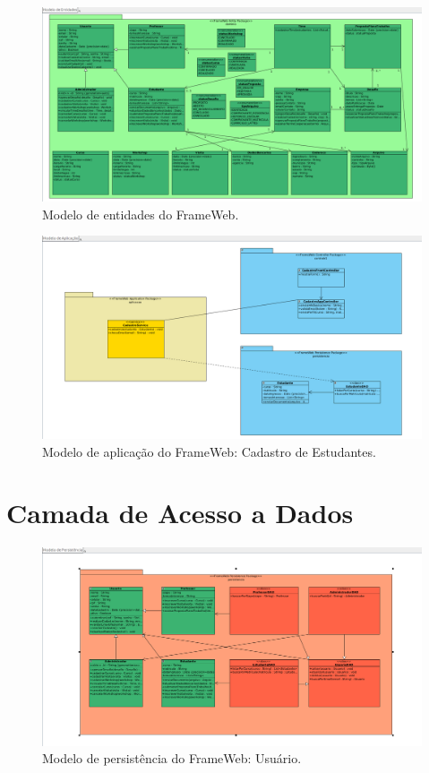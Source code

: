 \begin{figure}[H]
	\centering
	\includegraphics[width=1.0\textwidth]{figuras/figura_modelo_entidades.png}
	\caption{Modelo de entidades do FrameWeb.}
	\label{figura-entidades}
\end{figure}

\begin{figure}[H]
	\centering
	\includegraphics[width=1.0\textwidth]{figuras/figura_modelo_aplicacao.png}
	\caption{Modelo de aplicação do FrameWeb: Cadastro de Estudantes.}
	\label{figura-aplicacao}
\end{figure}

\section{Camada de Acesso a Dados}
\label{sec-frameweb-dados}

\begin{figure}[H]
	\centering
	\includegraphics[width=1.0\textwidth]{figuras/figura_modelo_persistencia.png}
	\caption{Modelo de persistência do FrameWeb: Usuário.}
	\label{figura-persistencia}
\end{figure}

